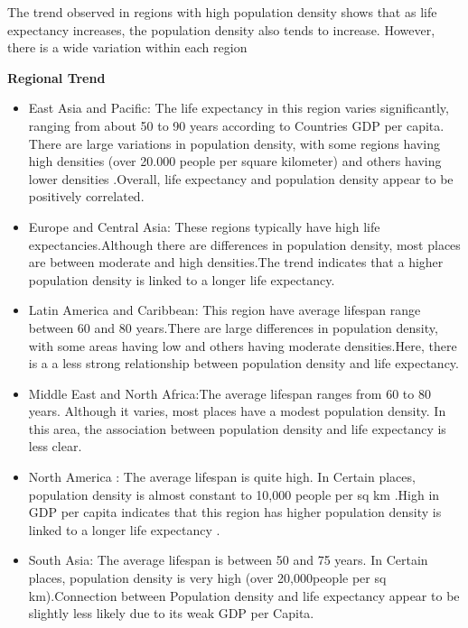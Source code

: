 \documentclass{article}\usepackage[]{graphicx}\usepackage[]{xcolor}
\begin{document}
The trend observed in regions with high population density shows that as life expectancy increases, the population density also tends to increase. However, there is a wide variation within each region

\textbf{Regional  Trend}
\begin{itemize}

\item{East Asia and Pacific: The life expectancy in this region varies significantly, ranging from about 50 to 90 years according to Countries GDP per capita. There are large variations in population density, with some regions having high densities (over 20.000 people per square kilometer) and others having lower densities .Overall, life expectancy and population density appear to be positively correlated.}

\item{Europe and Central Asia: These regions typically have high life expectancies.Although there are differences in population density, most places are between moderate and high densities.The trend indicates that a higher population density is linked to a longer life expectancy.}

\item{Latin America and Caribbean: This region have average lifespan range between 60 and 80 years.There are large differences in population density, with some areas having low and others having moderate densities.Here, there is a a less strong relationship between population density and life expectancy.}

\item{Middle East and North Africa:The average lifespan ranges from 60 to 80 years. Although it varies, most places have a modest population density. In this area, the association between population density and life expectancy is less clear.}

\item{North America : The average lifespan is quite high. In Certain places, population density is almost constant to 10,000 people per sq km .High in GDP per capita  indicates that this region has  higher population density is linked to a longer life expectancy .}

\item{South Asia: The average lifespan is between 50 and 75 years. In Certain places, population density is very high (over 20,000people per sq km).Connection  between Population density and life expectancy appear to be slightly less likely due to its weak GDP per Capita.}


\end{itemize}
\end{document}
